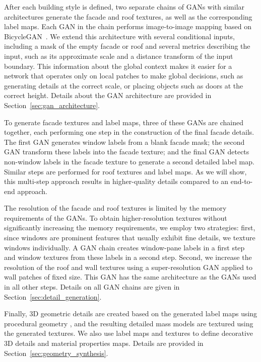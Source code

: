 After each building style is defined, two separate chains of GANs with similar architectures generate the facade and roof textures, as well as the corresponding label maps. Each GAN in the chain performs image-to-image mapping based on BicycleGAN~\cite{zhu2017multimodal}. We extend this architecture with several conditional inputs, including a mask of the empty facade or roof and several metrics describing the input, such as its approximate scale and a distance transform of the input boundary. This information about the global context makes it easier for a network that operates only on local patches to make global decisions, such as generating details at the correct scale, or placing objects such as doors at the correct height. Details about the GAN architecture are provided in Section~\ref{sec:gan_architecture}.

To generate facade textures and label maps, three of these GANs are chained together, each performing one step in the construction of the final facade details. The first GAN generates window labels from a blank facade mask; the second GAN transform these labels into the facade texture; and the final GAN detects non-window labels in the facade texture to generate a second detailed label map. Similar steps are performed for roof textures and label maps.
As we will show, this multi-step approach results in higher-quality details compared to an end-to-end approach.

The resolution of the facade and roof textures is limited by the memory requirements of the GANs. To obtain higher-resolution textures without significantly increasing the memory requirements, we employ two strategies: first, since windows are prominent features that usually exhibit fine details, we texture windows individually. A GAN chain creates window-pane labels in a first step and window textures from these labels in a second step. Second, we increase the resolution of the roof and wall textures using a super-resolution GAN applied to wall patches of fixed size. This GAN has the same architecture as the GANs used in all other steps. Details on all GAN chains are given in Section~\ref{sec:detail_generation}.

Finally,
3D geometric details are created based on the generated label maps using procedural geometry ,
and the resulting detailed mass models are textured using the generated textures.
We also use label maps and textures to define decorative 3D details and material properties maps. Details are provided in Section~\ref{sec:geometry_synthesis}. 

